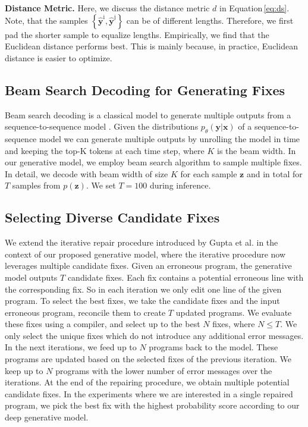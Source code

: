 \documentclass[runningheads]{llncs}
\newcommand{\equref}{Equation}
\newcommand{\myparagraph}[1]{\vspace{0.0em}\noindent\textbf{#1.}}
\begin{document}
\myparagraph{Distance Metric}
\label{para:metric}
Here, we discuss the distance metric $d$ in \equref \,\ref{eq:ds}. Note, that the samples $\left\{ \hat{\textbf{y}}^{\text{i}},\hat{\textbf{y}}^{\text{j}} \right\}$ can be of different lengths. Therefore, we first pad the shorter sample to equalize lengths. Empirically, we find that the Euclidean distance performs best. This is mainly because, in practice, Euclidean distance is easier to optimize.

\subsection{Beam Search Decoding for Generating Fixes}
Beam search decoding is a classical model to generate multiple outputs from a sequence-to-sequence model \cite{diverse_accurate,deshpande2019fast}. Given the distributions $p_{\theta}(\textbf{y} | \textbf{x})$ of a sequence-to-sequence model we can generate multiple outputs by unrolling the model in time and keeping the top-K tokens at each time step, where $K$ is the beam width. In our generative model, we employ beam search algorithm to sample multiple fixes. In detail,  we decode with beam width of size $K$ for each sample $\textbf{z}$ and in total for $T$ samples from $p(\textbf{z})$. We set $T = 100$ during inference.

\subsection{Selecting Diverse Candidate Fixes}
\label{subsec:selecting}

We extend the iterative repair procedure introduced by Gupta et al. \cite{Gupta2017DeepFixFC} in the context of our proposed generative model, where the iterative procedure now leverages multiple candidate fixes.
Given an erroneous program, the generative model outputs $T$ candidate fixes. Each fix contains a potential erroneous line with the corresponding fix. So in each iteration we only edit one line of the given program. To select the best fixes, we take the candidate fixes and the input erroneous program, reconcile them to create $T$ updated programs. We evaluate these fixes using a compiler, and select up to the best $N$ fixes, where $N \leq T$. We only select the unique fixes which do not introduce any additional error messages. In the next iterations, we feed up to $N$ programs back to the model. These programs are updated based on the selected fixes of the previous iteration. We keep up to $N$ programs with the lower number of error messages over the iterations. At the end of the repairing procedure, we obtain multiple potential candidate fixes. In the experiments where we are interested in a single repaired program, we pick the best fix with the highest probability score according to our deep generative model.
\end{document}
